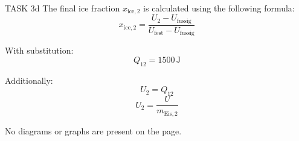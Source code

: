 TASK 3d  
The final ice fraction \( x_{\text{ice},2} \) is calculated using the following formula:  
\[
x_{\text{ice},2} = \frac{U_2 - U_{\text{fussig}}}{U_{\text{fest}} - U_{\text{fussig}}}
\]  

With substitution:  
\[
Q_{12} = 1500 \, \text{J}
\]  

Additionally:  
\[
U_2 = Q_{12}
\]  
\[
U_2 = \frac{U}{m_{\text{Eis},2}}
\]  

No diagrams or graphs are present on the page.